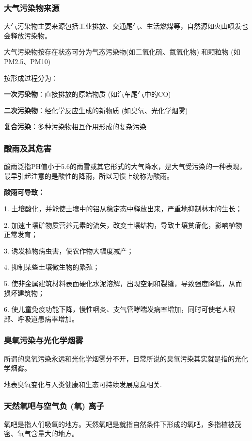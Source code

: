\documentclass[12pt,a4paper]{article}
\begin{document}
	\subsubsection{大气污染物来源}
	大气污染物主要来源包括工业排放、交通尾气、生活燃煤等，自然源如火山喷发也会释放污染物。
	
	大气污染物按存在状态可分为气态污染物(如二氧化硫、氮氧化物) 和颗粒物 (如PM2.5、PM10)
	
	按形成过程分为：
	
	\textbf{一次污染物}：直接排放的原始物质 (如汽车尾气中的CO)
	
	\textbf{二次污染物}：经化学反应生成的新物质 (如臭氧、光化学烟雾)
	
	\textbf{复合污染}：多种污染物相互作用形成的复杂污染
	\subsubsection{酸雨及其危害}
	酸雨泛指PH值小于5.6的雨雪或其它形式的大气降水，是大气受污染的一种表现，最早引起注意的是酸性的降雨，所以习惯上统称为酸雨。
	
	\textbf{酸雨可导致：}
	
	1. 土壤酸化，并能使土壤中的铝从稳定态中释放出来，严重地抑制林木的生长；
	
	2. 加速土壤矿物质营养元素的流失，改变土壤结构，导致土壤贫瘠化，影响植物正常发育；
	
	3. 诱发植物病虫害，使农作物大幅度减产；
	
	4. 抑制某些土壤微生物的繁殖；
	
	5. 使非金属建筑材料表面硬化水泥溶解，出现空洞和裂缝，导致强度降低，从而损坏建筑物；
	
	6. 使儿童免疫功能下降，慢性咽炎、支气管哮喘发病率增加，同时可使老人眼部、呼吸道患病率增加。
	
	\subsubsection{臭氧污染与光化学烟雾}
	所谓的臭氧污染永远和光化学烟雾分不开，日常所说的臭氧污染其实就是指的光化学烟雾。
	
	地表臭氧变化与人类健康和生态可持续发展息息相关.
	
	\subsubsection{天然氧吧与空气负 (氧) 离子}
	
	氧吧是指人们吸氧的地方。天然氧吧是就指自然条件下形成的氧吧，多指植被茂密、氧气含量大的地方。
	
\end{document}
